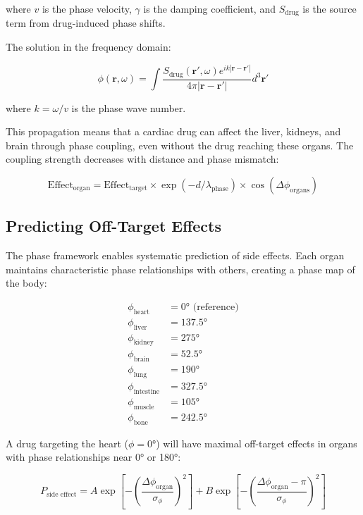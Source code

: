 \documentclass[12pt,a4paper]{report}
\begin{document}
where $v$ is the phase velocity, $\gamma$ is the damping coefficient, and $S_{\text{drug}}$ is the source term from drug-induced phase shifts.

The solution in the frequency domain:

\begin{equation}
\phi(\mathbf{r}, \omega) = \int \frac{S_{\text{drug}}(\mathbf{r}', \omega) e^{ik|\mathbf{r} - \mathbf{r}'|}}{4\pi|\mathbf{r} - \mathbf{r}'|} d^3\mathbf{r}'
\end{equation}

where $k = \omega/v$ is the phase wave number.

This propagation means that a cardiac drug can affect the liver, kidneys, and brain through phase coupling, even without the drug reaching these organs. The coupling strength decreases with distance and phase mismatch:

\begin{equation}
\text{Effect}_{\text{organ}} = \text{Effect}_{\text{target}} \times \exp(-d/\lambda_{\text{phase}}) \times \cos(\Delta\phi_{\text{organs}})
\end{equation}

\subsection{Predicting Off-Target Effects}

The phase framework enables systematic prediction of side effects. Each organ maintains characteristic phase relationships with others, creating a phase map of the body:

\begin{align}
\phi_{\text{heart}} &= 0° \text{ (reference)} \\
\phi_{\text{liver}} &= 137.5° \\
\phi_{\text{kidney}} &= 275° \\
\phi_{\text{brain}} &= 52.5° \\
\phi_{\text{lung}} &= 190° \\
\phi_{\text{intestine}} &= 327.5° \\
\phi_{\text{muscle}} &= 105° \\
\phi_{\text{bone}} &= 242.5°
\end{align}

A drug targeting the heart ($\phi = 0°$) will have maximal off-target effects in organs with phase relationships near 0° or 180°:

\begin{equation}
P_{\text{side effect}} = A \exp\left[-\left(\frac{\Delta\phi_{\text{organ}}}{\sigma_\phi}\right)^2\right] + B \exp\left[-\left(\frac{\Delta\phi_{\text{organ}} - \pi}{\sigma_\phi}\right)^2\right]
\end{equation}
\end{document}
